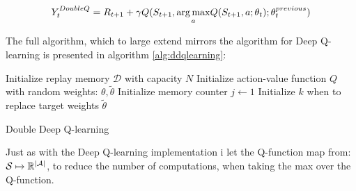 \begin{equation}\label{eq:ddqn_target_final}
    Y_t^{DoubleQ} = R_{t+1} + \gamma Q(S_{t+1}, \underset{a}{\operatorname*{arg\,max}}Q(S_{t+1}, a; \theta_t); \theta_t^{previous}) 
\end{equation}

The full algorithm, which to large extend mirrors the algorithm for Deep Q-learning is presented in algorithm \ref{alg:ddqlearning}:

\begin{algorithm}[H]
\SetAlgoLined
 Initialize replay memory $\mathcal{D}$ with capacity $N$\;
 Initialize action-value function $Q$ with random weights: $\theta, \tilde{\theta}$\;
 Initialize memory counter $j \leftarrow 1$\;
 Initialize $k$ when to replace target weights $\tilde{\theta}$\;
\caption{Double Deep Q-learning}
\label{alg:ddqlearning}
\end{algorithm}

Just as with the Deep Q-learning implementation i let the Q-function map from: $\mathcal{S} \mapsto \mathbb{R}^{\mid \mathcal{A} \mid}$, to reduce the number of computations, when taking the max over the Q-function. 


